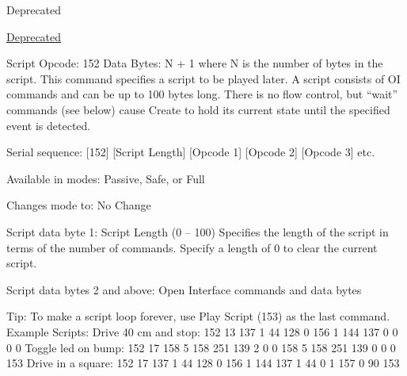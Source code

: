 \begin{Desc}
\begin{description}
\begin{DoxyRefDesc}{Deprecated}
\item[\hyperlink{deprecated__deprecated000003}{Deprecated}]\end{DoxyRefDesc}
\item[{\em 
\hypertarget{group__roomba-lib_gga305e17dfb7050ad83ea49ded2e6a2e24a65154c0ec97cb74cba7359ca02c4ab54}{}S\+C\+R\+I\+P\+T\label{group__roomba-lib_gga305e17dfb7050ad83ea49ded2e6a2e24a65154c0ec97cb74cba7359ca02c4ab54}
}]Script Opcode\+: 152 Data Bytes\+: N + 1 where N is the number of bytes in the script. This command specifies a script to be played later. A script consists of O\+I commands and can be up to 100 bytes long. There is no flow control, but “wait” commands (see below) cause Create to hold its current state until the specified event is detected.
\begin{DoxyItemize}
\item Serial sequence\+: \mbox{[}152\mbox{]} \mbox{[}Script Length\mbox{]} \mbox{[}Opcode 1\mbox{]} \mbox{[}Opcode 2\mbox{]} \mbox{[}Opcode 3\mbox{]} etc.
\item Available in modes\+: Passive, Safe, or Full
\item Changes mode to\+: No Change
\item Script data byte 1\+: Script Length (0 – 100) Specifies the length of the script in terms of the number of commands. Specify a length of 0 to clear the current script.
\item Script data bytes 2 and above\+: Open Interface commands and data bytes
\end{DoxyItemize}

Tip\+: To make a script loop forever, use Play Script (153) as the last command. Example Scripts\+: Drive 40 cm and stop\+: 152 13 137 1 44 128 0 156 1 144 137 0 0 0 0 Toggle led on bump\+: 152 17 158 5 158 251 139 2 0 0 158 5 158 251 139 0 0 0 153 Drive in a square\+: 152 17 137 1 44 128 0 156 1 144 137 1 44 0 1 157 0 90 153


\end{description}
\end{Desc}
